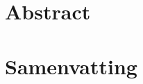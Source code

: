 \chapter{Abstract}

\blindtext

\blindtext

\blindtext

\blindtext

\blindtext

\blindtext

\cleartorecto


\chapter{Samenvatting}

\blindtext

\blindtext

\blindtext

\blindtext

\blindtext

\blindtext


